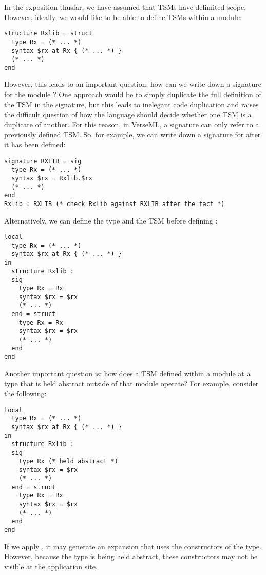 In the exposition thusfar, we have assumed that TSMs have delimited scope. However, ideally, we would like to be able to define TSMs within a module:
\begin{lstlisting}[numbers=none]
structure Rxlib = struct 
  type Rx = (* ... *)
  syntax $rx at Rx { (* ... *) }
  (* ... *)
end
\end{lstlisting}
However, this leads to an important question: how can we write down a signature for the module ? One approach would be to simply duplicate the full definition of the TSM in the signature, but this leads to inelegant code duplication and raises the difficult question of how the language should decide whether one TSM is a duplicate of another. For this reason, in VerseML, a signature can only refer to a previously defined TSM. So, for example, we can write down a signature for  after it has been defined:

\begin{lstlisting}[numbers=none]
signature RXLIB = sig 
  type Rx = (* ... *)
  syntax $rx = Rxlib.$rx
  (* ... *)
end
Rxlib : RXLIB (* check Rxlib against RXLIB after the fact *)
\end{lstlisting}

Alternatively, we can define the type  and the TSM  before defining :
\begin{lstlisting}[numbers=none]
local 
  type Rx = (* ... *)
  syntax $rx at Rx { (* ... *) }
in 
  structure Rxlib : 
  sig 
    type Rx = Rx
    syntax $rx = $rx
    (* ... *)
  end = struct 
    type Rx = Rx 
    syntax $rx = $rx
    (* ... *)
  end
end 
\end{lstlisting}

Another important question is: how does a TSM defined within a module at a type that is held abstract outside of that module operate? For example, consider the following:
\begin{lstlisting}[numbers=none]
local 
  type Rx = (* ... *)
  syntax $rx at Rx { (* ... *) }
in 
  structure Rxlib : 
  sig 
    type Rx (* held abstract *)
    syntax $rx = $rx
    (* ... *)
  end = struct 
    type Rx = Rx
    syntax $rx = $rx
    (* ... *)
  end
end 
\end{lstlisting}
If we apply , it may generate an expansion that uses the constructors of the  type. However, because the type is being held abstract, these constructors may not be visible at the application site. 

